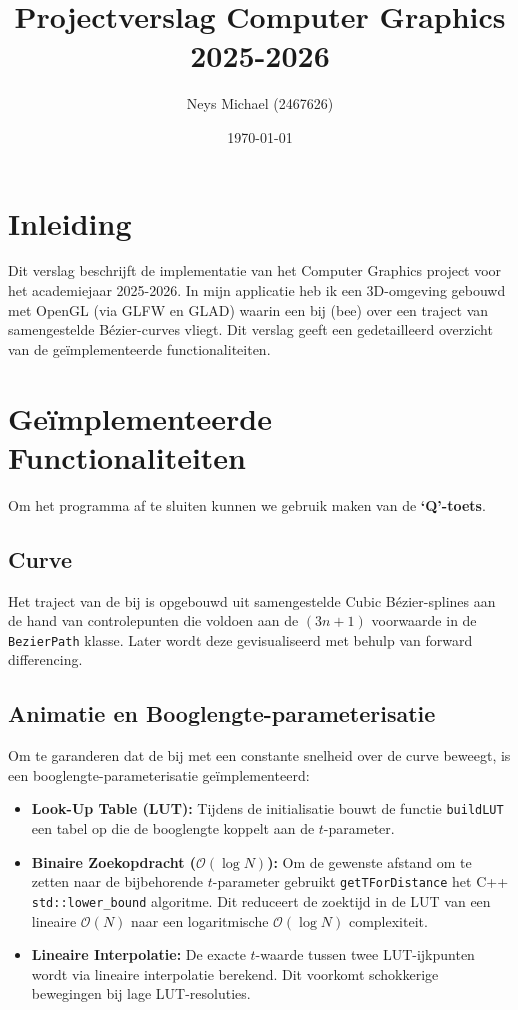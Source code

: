 \documentclass[11pt,a4paper]{article}
\title{\textbf{Projectverslag Computer Graphics 2025-2026}}
\author{Neys Michael (2467626)}
\date{\today}
\begin{document}
\maketitle

\section{Inleiding}
Dit verslag beschrijft de implementatie van het Computer Graphics project voor het academiejaar 2025-2026. In mijn applicatie heb ik een 3D-omgeving gebouwd met OpenGL (via GLFW en GLAD) waarin een bij (bee) over een traject van samengestelde Bézier-curves vliegt. Dit verslag geeft een gedetailleerd overzicht van de geïmplementeerde functionaliteiten.

\section{Geïmplementeerde Functionaliteiten}

Om het programma af te sluiten kunnen we gebruik maken van de \textbf{`Q'-toets}.

\subsection{Curve}
Het traject van de bij is opgebouwd uit samengestelde Cubic Bézier-splines aan de hand van controlepunten die voldoen aan de $(3n + 1)$ voorwaarde in de \texttt{BezierPath} klasse. Later wordt deze gevisualiseerd met behulp van forward differencing.

\subsection{Animatie en Booglengte-parameterisatie}

Om te garanderen dat de bij met een constante snelheid over de curve beweegt, is een booglengte-parameterisatie geïmplementeerd:
\begin{itemize}
	\item \textbf{Look-Up Table (LUT):} Tijdens de initialisatie bouwt de functie \texttt{buildLUT} een tabel op die de booglengte koppelt aan de $t$-parameter.
	\item \textbf{Binaire Zoekopdracht ($\mathcal{O}(\log N)$):} Om de gewenste afstand om te zetten naar de bijbehorende $t$-parameter gebruikt \texttt{getTForDistance} het C++ \texttt{std::lower\_bound} algoritme. Dit reduceert de zoektijd in de LUT van een lineaire $\mathcal{O}(N)$ naar een logaritmische $\mathcal{O}(\log N)$ complexiteit.
	\item \textbf{Lineaire Interpolatie:} De exacte $t$-waarde tussen twee LUT-ijkpunten wordt via lineaire interpolatie berekend. Dit voorkomt schokkerige bewegingen bij lage LUT-resoluties.
\end{itemize}
\end{document}
